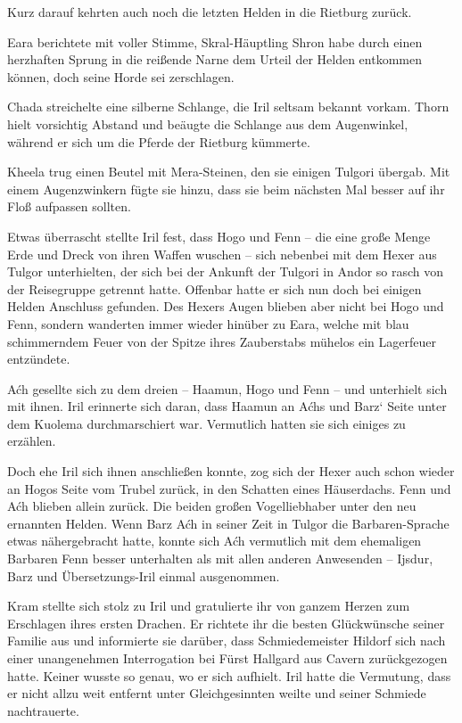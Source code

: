 Kurz darauf kehrten auch noch die letzten Helden in die Rietburg zurück.

Eara berichtete mit voller Stimme, Skral-Häuptling Shron habe durch einen herzhaften Sprung in die reißende Narne dem Urteil der Helden entkommen können, doch seine Horde sei zerschlagen.

Chada streichelte eine silberne Schlange, die Iril seltsam bekannt vorkam. Thorn hielt vorsichtig Abstand und beäugte die Schlange aus dem Augenwinkel, während er sich um die Pferde der Rietburg kümmerte.

Kheela trug einen Beutel mit Mera-Steinen, den sie einigen Tulgori übergab. Mit einem Augenzwinkern fügte sie hinzu, dass sie beim nächsten Mal besser auf ihr Floß aufpassen sollten.

Etwas überrascht stellte Iril fest, dass Hogo und Fenn – die eine große Menge Erde und Dreck von ihren Waffen wuschen – sich nebenbei mit dem Hexer aus Tulgor unterhielten, der sich bei der Ankunft der Tulgori in Andor so rasch von der Reisegruppe getrennt hatte. Offenbar hatte er sich nun doch bei einigen Helden Anschluss gefunden. Des Hexers Augen blieben aber nicht bei Hogo und Fenn, sondern wanderten immer wieder hinüber zu Eara, welche mit blau schimmerndem Feuer von der Spitze ihres Zauberstabs mühelos ein Lagerfeuer entzündete.

Aćh gesellte sich zu dem dreien – Haamun, Hogo und Fenn – und unterhielt sich mit ihnen. Iril erinnerte sich daran, dass Haamun an Aćhs und Barz‘ Seite unter dem Kuolema durchmarschiert war. Vermutlich hatten sie sich einiges zu erzählen.

Doch ehe Iril sich ihnen anschließen konnte, zog sich der Hexer auch schon wieder an Hogos Seite vom Trubel zurück, in den Schatten eines Häuserdachs. Fenn und Aćh blieben allein zurück. Die beiden großen Vogelliebhaber unter den neu ernannten Helden. Wenn Barz Aćh in seiner Zeit in Tulgor die Barbaren-Sprache etwas nähergebracht hatte, konnte sich Aćh vermutlich mit dem ehemaligen Barbaren Fenn besser unterhalten als mit allen anderen Anwesenden – Ijsdur, Barz und Übersetzungs-Iril einmal ausgenommen.

Kram stellte sich stolz zu Iril und gratulierte ihr von ganzem Herzen zum Erschlagen ihres ersten Drachen. Er richtete ihr die besten Glückwünsche seiner Familie aus und informierte sie darüber, dass Schmiedemeister Hildorf sich nach einer unangenehmen Interrogation bei Fürst Hallgard aus Cavern zurückgezogen hatte. Keiner wusste so genau, wo er sich aufhielt. Iril hatte die Vermutung, dass er nicht allzu weit entfernt unter Gleichgesinnten weilte und seiner Schmiede nachtrauerte.

